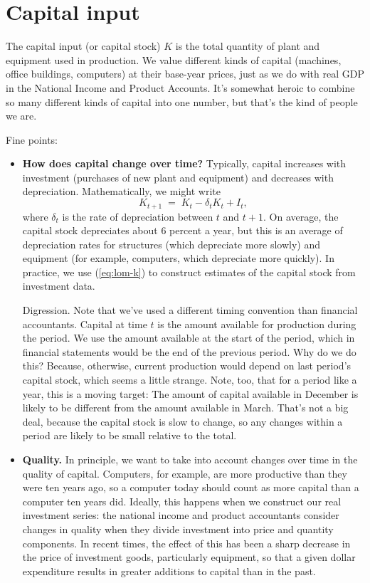 \section{Capital input}

The capital input (or capital stock) $K$
is the total quantity of plant and equipment used in production.
We value different kinds of capital (machines, office buildings, computers)
at their base-year prices, just as we do with real GDP in the National Income and Product Accounts.
It's somewhat heroic to combine so many different kinds of capital into one
number, but that's the kind of people we are.

Fine points:
\begin{itemize}
\item \textbf{How does capital change over time?}
Typically, capital increases with investment (purchases of new plant and equipment)
and decreases with depreciation.
Mathematically, we might write
\begin{equation}
    K_{t+1} \;=\; K_{t} - \delta_t K_{t} + I_{t} ,
    \label{eq:lom-k}
\end{equation}
where $\delta_t$ is the rate of depreciation between $t$ and $t+1$.
On average, the capital stock depreciates about 6 percent a year,
but this is an average of depreciation rates for structures
(which depreciate more slowly) and equipment
(for example, computers, which depreciate more quickly).
In practice, we use (\ref{eq:lom-k}) to construct
estimates of the capital stock from investment data.

Digression.
{\footnotesize
 Note that we've used a different timing convention
than financial accountants.
Capital at time $t$ is the amount available for production
during the period.
We use the amount available at the start of the period,
which in financial statements would be the end of the previous
period.
Why do we do this?  Because, otherwise,
current production would depend on last period's
capital stock, which seems a little strange.
Note, too, that for a period like a year, this is a moving target:
The amount of capital available in December is likely to
be different from the amount available in March.
That's not a big deal, because the capital stock is slow to change,
so any changes within a period are likely to be small relative to the total.}

\item \textbf{Quality.}
In principle, we want to take into account changes over time
in the quality of capital.
Computers, for example, are more productive than they were
ten years ago, so a computer today should count as more capital
than a computer ten years did.
Ideally, this happens when we construct our real investment series:
the national income and product accountants consider changes
in quality when they divide investment into price and quantity components.
In recent times, the effect of this has been a sharp decrease
in the price of investment goods,
particularly equipment,
so that a given dollar expenditure
results in greater additions to capital than in the past.



\end{itemize}

